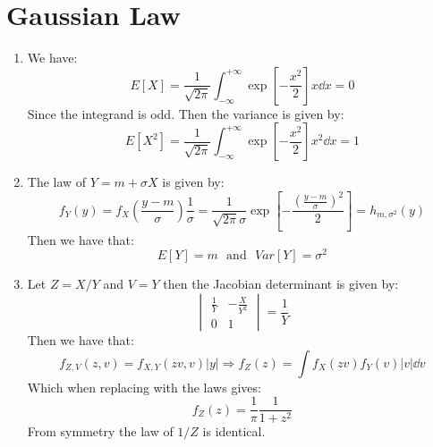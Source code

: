 \documentclass[10pt,a4paper]{book}
\begin{document}
\section{Gaussian Law}

\begin{enumerate}

\item We have:
\[
E[X] = \frac{1}{\sqrt{2\pi}}\int_{-\infty}^{+\infty} \exp[-\frac{x^2}{2}] x \dd x = 0
\]
Since the integrand is odd. Then the variance is given by:
\[
E[X^2] = \frac{1}{\sqrt{2 \pi}} \int_{-\infty}^{+\infty} \exp[-\frac{x^2}{2}] x^2 \dd x = 1
\]

\item The law of $Y = m + \sigma X$ is given by:
\[
f_Y(y) = f_X(\frac{y - m}{\sigma}) \frac{1}{\sigma} = \frac{1}{\sqrt{2\pi} \sigma} \exp[- \frac{(\frac{y - m}{\sigma})^2}{2}]  = h_{m, \sigma^2}(y)
\]
Then we have that:
\[
E[Y] = m \mbox{~~and~~} Var[Y] = \sigma^2
\]

\item Let $Z = X/Y$ and $V = Y$ then the Jacobian determinant is given by:
\[
\begin{vmatrix}
\frac{1}{Y} & -\frac{X}{Y^2}\\
0 & 1
\end{vmatrix} = \frac{1}{Y}
\]
Then we have that:
\[
f_{Z, V}(z, v) = f_{X, Y}(zv, v) |y| \Rightarrow f_Z(z) = \int f_{X}(zv)f_Y(v)|v| \dd v
\]
Which when replacing with the laws gives:
\[
f_{Z}(z) = \frac{1}{\pi} \frac{1}{1 + z^2}
\]
From symmetry the law of $1/Z$ is identical.

\end{enumerate}
\end{document}
